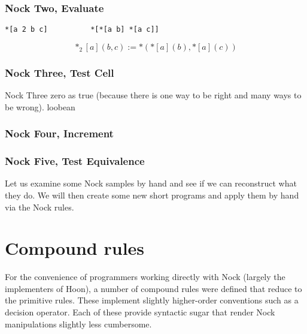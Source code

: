 \subsubsection[Nock Two]{Nock Two, Evaluate}

\begin{lstlisting}[style=nonumbers]
*[a 2 b c]          *[*[a b] *[a c]]
\end{lstlisting}

$$
*_{2}[a](b,c) := *({*[a](b)}, {*[a](c)})
$$

\subsubsection[Nock Three]{Nock Three, Test Cell}


Nock Three
zero as true (because there is one way to be right and many ways to be wrong).
loobean

\subsubsection[Nock Four]{Nock Four, Increment}
\subsubsection[Nock Five]{Nock Five, Test Equivalence}

Let us examine some Nock samples by hand and see if we can reconstruct what they do.  We will then create some new short programs and apply them by hand via the Nock rules.


\section{Compound rules}

For the convenience of programmers working directly with Nock (largely the implementers of Hoon), a number of compound rules were defined that reduce to the primitive rules.  These implement slightly higher-order conventions such as a decision operator.  Each of these provide syntactic sugar that render Nock manipulations slightly less cumbersome.


